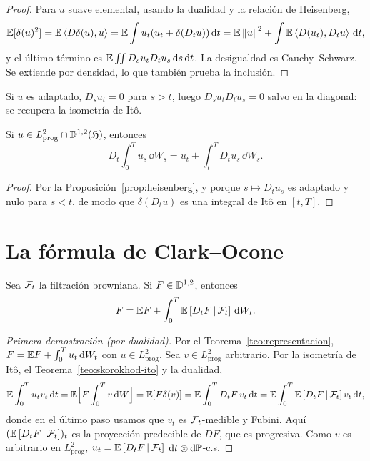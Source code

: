\begin{proof}
Para $u$ suave elemental, usando la dualidad y la relación de Heisenberg,
\[
  \mathbb{E}[\delta(u)^2]=\mathbb{E}\left\langle D\delta(u), u\right\rangle=\mathbb{E}\int u_t(u_t+\delta(D_tu))\,\mathrm{d} t=\mathbb{E}\left\lVert u\right\rVert^2+\int\mathbb{E}\left\langle D(u_t), D_tu\right\rangle\,\mathrm{d} t,
\]
y el último término es $\mathbb{E}\iint D_su_tD_tu_s\,\mathrm{d} s\,\mathrm{d} t$. La desigualdad es Cauchy--Schwarz. Se extiende
por densidad, lo que también prueba la inclusión.
\end{proof}

Si $u$ es adaptado, $D_su_t=0$ para $s>t$, luego $D_su_tD_tu_s=0$ salvo en la diagonal: se recupera
la isometría de Itô.

\begin{corolario}\label{cor:derivada-ito}
Si $u\in L^2_{\mathrm{prog}}\cap\mathbb{D}^{1,2}(\mathfrak{H})$, entonces
\[
  D_t\int_0^Tu_s\,\dd W_s=u_t+\int_t^TD_tu_s\,\dd W_s.
\]
\end{corolario}

\begin{proof}
Por la Proposición~\ref{prop:heisenberg}, y porque $s\mapsto D_tu_s$ es adaptado y nulo para $s<t$, de
modo que $\delta(D_tu)$ es una integral de Itô en $[t,T]$.
\end{proof}

\section{La fórmula de Clark--Ocone}

\begin{teorema}\label{teo:clark-ocone}
Sea $\mathcal{F}_t$ la filtración browniana. Si $F\in\mathbb{D}^{1,2}$, entonces
\[
  F=\mathbb{E} F+\int_0^T\mathbb{E}\left[D_tF\,\middle|\,\mathcal{F}_t\right]\,\mathrm{d} W_t.
\]
\end{teorema}

\begin{proof}[Primera demostración (por dualidad)]
Por el Teorema~\ref{teo:representacion}, $F=\mathbb{E} F+\int_0^Tu_t\,\mathrm{d} W_t$ con $u\in L^2_{\mathrm{prog}}$.
Sea $v\in L^2_{\mathrm{prog}}$ arbitrario. Por la isometría de Itô, el Teorema~\ref{teo:skorokhod-ito} y la dualidad,
\[
  \mathbb{E}\int_0^Tu_tv_t\,\mathrm{d} t=\mathbb{E}\Big[F\int_0^Tv\,\mathrm{d} W\Big]=\mathbb{E}[F\delta(v)]=\mathbb{E}\int_0^TD_tF\,v_t\,\mathrm{d} t=\mathbb{E}\int_0^T\mathbb{E}\left[D_tF\,\middle|\,\mathcal{F}_t\right]v_t\,\mathrm{d} t,
\]
donde en el último paso usamos que $v_t$ es $\mathcal{F}_t$-medible y Fubini. Aquí $(\mathbb{E}\left[D_tF\,\middle|\,\mathcal{F}_t\right])_t$ es la
proyección predecible de $DF$, que es progresiva. Como $v$ es arbitrario en $L^2_{\mathrm{prog}}$, $u_t=\mathbb{E}\left[D_tF\,\middle|\,\mathcal{F}_t\right]$
$\mathrm{d} t\otimes\mathrm{d}\mathbb{P}$-c.s.
\end{proof}

